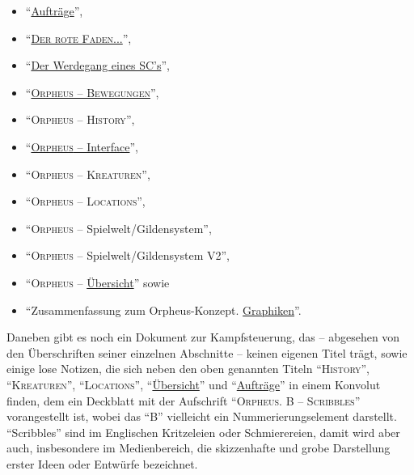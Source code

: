 \documentclass[a5paper,pagesize,numbers=noenddot]{scrbook}
\begin{document}
\begin{itemize}
   \item \enquote{\uline{Aufträge}},\autocite[S.~16--17]{orpheus_b_scribbles}
   \item \enquote{\uline{\textsc{Der rote Faden...}}},\autocite{orpheus_der_rote}
   \item \enquote{\uline{Der Werdegang eines SC's}},\autocite{orpheus_der_werdegang}
   \item \enquote{\uline{\textsc{Orpheus -- Bewegungen}}},\autocite{orpheus_bewegungen}
   \item \enquote{\textsc{Orpheus -- History}},\autocite[S.~2--3]{orpheus_b_scribbles}
   \item \enquote{\uline{\textsc{Orpheus} -- Interface}},\autocite{orpheus_interface}
   \item \enquote{\textsc{Orpheus -- Kreaturen}},\autocite[S.~4]{orpheus_b_scribbles}
   \item \enquote{\textsc{Orpheus -- Locations}},\autocite[S.~5]{orpheus_b_scribbles}
   \item \enquote{\textsc{Orpheus} -- Spielwelt/Gildensystem},\autocite{orpheus_gildensystem}
   \item \enquote{\textsc{Orpheus} -- Spielwelt/Gildensystem V2},\autocite{orpheus_gildensystem_v2}
   \item \enquote{\textsc{Orpheus} -- \uline{Übersicht}}\autocite[S.~11--14]{orpheus_b_scribbles} sowie
   \item \enquote{Zusammenfassung zum Orpheus-Konzept. \uline{Graphiken}}.\autocite{orpheus_zusammenfassung_1996}
\end{itemize}

\noindent Daneben gibt es noch ein Dokument zur Kampfsteuerung,\autocite{orpheus_kampfsteuerung} das -- abgesehen von den Überschriften seiner einzelnen Abschnitte -- keinen eigenen Titel trägt, sowie einige lose Notizen, die sich neben den oben genannten Titeln \enquote{\textsc{History}}, \enquote{\textsc{Kreaturen}}, \enquote{\textsc{Locations}}, \enquote{\uline{Übersicht}} und \enquote{\uline{Aufträge}} in einem Konvolut finden, dem ein Deckblatt mit der Aufschrift \enquote{\textsc{Orpheus. B -- Scribbles}} vorangestellt ist,\autocite{orpheus_b_scribbles} wobei das \enquote{B} vielleicht ein Nummerierungselement darstellt.%
\enquote{Scribbles} sind im Englischen Kritzeleien oder Schmierereien, damit wird aber auch, insbesondere im Medienbereich, die skizzenhafte und grobe Darstellung erster Ideen oder Entwürfe bezeichnet.\autocite[S.~128]{seebohn_werbung_2011}
\end{document}
